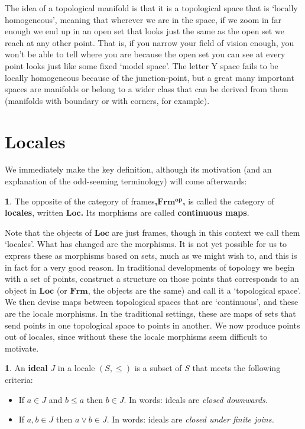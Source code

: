 \documentclass[oneside,english]{amsbook}
\numberwithin{section}{chapter}
\theoremstyle{plain}
\theoremstyle{definition}
\newtheorem{defn}[thm]{\protect\definitionname}
\providecommand{\definitionname}{Definition}
\begin{document}
The idea of a topological manifold is that it is a topological space that is `locally homogeneous', meaning that wherever we are in the space, if we zoom in far enough we end up in an open set that looks just the same as the open set we reach at any other point. That is, if you narrow your field of vision enough, you won't be able to tell where you are because the open set you can see at every point looks just like some fixed `model space'. The letter Y space fails to be locally homogeneous because of the junction-point, but a great many important spaces are manifolds or belong to a wider class that can be derived from them (manifolds with boundary or with corners, for example).


\section{Locales}

We immediately make the key definition, although its motivation (and an explanation of the odd-seeming terminology) will come afterwards: 

\begin{defn} 
	The opposite of the category of frames\textbf{,$\mathbf{Frm^{op}}$,} is called the category of \textbf{locales}, written \textbf{$\mathbf{Loc}$. }Its morphisms are called \textbf{continuous maps}. 
\end{defn} 

Note that the objects of \textbf{$\mathbf{Loc}$ }are just frames, though in this context we call them `locales'. What has changed are the morphisms. It is not yet possible for us to express these as morphisms based on sets, much as we might wish to, and this is in fact for a very good reason. In traditional developments of topology we begin with a set of points, construct a structure on those points that corresponds to an object in \textbf{$\mathbf{Loc}$} (or\textbf{ $\mathbf{Frm}$}, the objects are the same) and call it a `topological space'. We then devise maps between topological spaces that are `continuous', and these are the locale morphisms. In the traditional settings, these are maps of sets that send points in one topological space to points in another. We now produce points out of locales, since without these the locale morphisms seem difficult to motivate. 

\begin{defn} 
	An \textbf{ideal} $J$ in a locale $(S,\le)$ is a subset of $S$ that meets the following criteria: 
	\begin{itemize} 
		\item If $a\in J$ and $b\le a$ then $b\in J$. In words: ideals are \emph{closed downwards.} 
		\item If $a,b\in J$ then $a\lor b\in J$. In words: ideals are \emph{closed under finite joins.} 
	\end{itemize} 
\end{defn}
\end{document}
